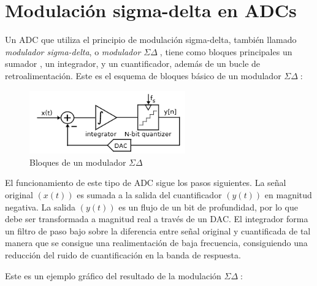 \documentclass[12pt]{report} %
\newcommand{\sigmadelta}{$\Sigma\Delta\; $}
\begin{document}
	\section{Modulación sigma-delta en ADCs}
	
	Un ADC que utiliza el principio de modulación sigma-delta, también llamado \textit{modulador sigma-delta}, o \textit{modulador \sigmadelta}, tiene como bloques principales un sumador
	, un integrador, y un cuantificador, además de un bucle de retroalimentación. Este es el esquema de bloques básico de un modulador \sigmadelta:
	
	\begin{figure}[H]
		\includegraphics[width=0.6\textwidth]{sigma-delta-blocks.png}
		\caption[Bloques de un modulador \sigmadelta]{Bloques de un modulador \sigmadelta\protect\footnotemark}
		\label{fig:sigma-delta-blocks.png}
	\end{figure}
	
	El funcionamiento de este tipo de ADC sigue los pasos siguientes. La señal original $( x(t) )$ es sumada a la salida del cuantificador $( y(t) )$ en magnitud negativa. La salida $( y(t) )$ es un flujo de un bit de profundidad, por lo que debe ser transformada a magnitud real a través de un DAC. El integrador forma un filtro de paso bajo sobre la diferencia entre señal original y cuantificada de tal manera que se consigue una realimentación de baja frecuencia, consiguiendo una reducción del ruido de cuantificación en la banda de respuesta.
	
	Este es un ejemplo gráfico del resultado de la modulación \sigmadelta:
	
\end{document}
